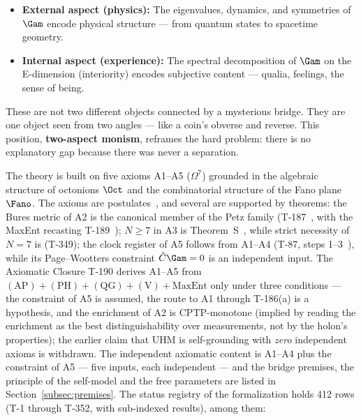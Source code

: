 \begin{itemize}[leftmargin=2em]
  \item \textbf{External aspect (physics):} The eigenvalues, dynamics, and symmetries of
        $\Gam$ encode physical structure --- from quantum states to spacetime geometry.
  \item \textbf{Internal aspect (experience):} The spectral decomposition of $\Gam$ on
        the E-dimension (interiority) encodes subjective content --- qualia, feelings,
        the sense of being.
\end{itemize}

These are not two different objects connected by a mysterious bridge. They
are one object seen from two angles --- like a coin's obverse and reverse.
This position, \textbf{two-aspect monism}, reframes the hard problem: there
is no explanatory gap because there was never a separation.

The theory is built on five axioms A1--A5 ($\Omega^{7}$) grounded in the
algebraic structure of octonions $\Oct$ and the combinatorial structure of
the Fano plane $\Fano$. The axioms are postulates~, and several are
supported by theorems: the Bures metric of A2 is the canonical member of the
Petz family (T-187~, with the MaxEnt recasting T-189~);
$N \geq 7$ in A3 is Theorem~S~, while strict necessity of $N = 7$ is
 (T-349); the clock register of A5 follows from A1--A4
(T-87, steps 1--3~), while its Page--Wootters constraint
$\hat C\Gam = 0$ is an independent input. The Axiomatic Closure T-190 derives
A1--A5 from $(\text{AP})+(\text{PH})+(\text{QG})+(\text{V})+\text{MaxEnt}$ only
 under three conditions --- the constraint of A5 is assumed, the
route to A1 through T-186(a) is a hypothesis, and the enrichment of A2 is CPTP-monotone (implied by reading the enrichment as the best distinguishability over measurements, not by the holon's properties); the earlier claim that UHM is
self-grounding with \emph{zero} independent axioms is withdrawn. The
independent axiomatic content is A1--A4 plus the constraint of A5 --- five
inputs, each independent --- and the bridge premises, the principle of the
self-model and the free parameters are listed in Section~\ref{subsec:premises}.
The status registry of the formalization holds 412 rows (T-1 through T-352,
with sub-indexed results), among them:


